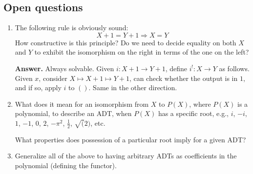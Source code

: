 \documentclass[letterpaper,numbers=enddot]{scrartcl}
\newcommand{\then}{\mathbin{\Longrightarrow}}
\begin{document}
\subsection{Open questions}

\begin{enumerate}
  \item The following rule is obviously sound:
  \[ X+1 = Y+1 \then X=Y \]
  How constructive is this principle?
  Do we need to decide equality on both $X$ and $Y$ to exhibit the
  isomorphism on the right in terms of the one on the left?

  \textbf{Answer.}
  Always solvable.  Given $i : X+1 \to Y+1$, define $i^! :X \to Y$ as follows.
  Given $x$, consider $X \mapsto X+1 \mapsto Y+1$, can check whether the output is in $1$, and if so,
  apply $i$ to $()$.  Same in the other direction.

  \item What does it mean for an isomorphism from $X$ to $P(X)$, where $P(X)$
  is a polynomial, to describe an ADT, when $P(X)$ has a specific root,
  e.g., $i$, $-i$, $1$, $-1$, $0$, $2$, $-\pi^2$, $\frac{1}{2}$, $\sqrt(2)$, etc.

  What properties does possession of a particular root imply for a given ADT?

  \item Generalize all of the above to having arbitrary ADTs as coefficients
  in the polynomial (defining the functor).

\end{enumerate}
\end{document}

